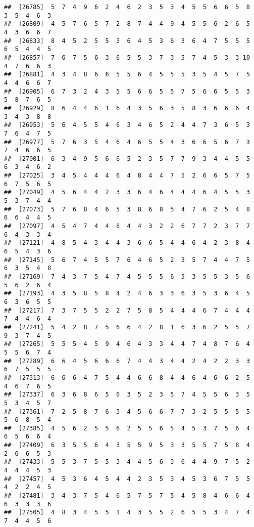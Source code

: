 \documentclass[
]{book}
\begin{document}
\begin{verbatim}
##  [26785]  5  7  4  9  6  2  4  6  2  3  5  3  4  5  5  6  6  5  8  3  5  4  6  3
##  [26809]  4  5  7  6  5  7  2  8  7  4  4  9  4  5  5  6  2  6  5  4  3  6  6  7
##  [26833]  8  4  5  2  5  5  3  6  4  5  3  6  3  6  4  7  5  5  5  6  5  4  4  5
##  [26857]  7  6  7  5  6  3  6  5  5  3  7  3  5  7  4  5  3  3 10  4  7  6  6  3
##  [26881]  4  3  4  8  6  6  5  5  6  4  5  5  5  3  5  4  5  7  5  4  4  6  6  7
##  [26905]  6  7  3  2  4  3  5  5  6  6  5  5  7  5  6  6  5  5  3  5  8  7  6  5
##  [26929]  8  6  4  4  6  1  6  4  3  5  6  3  5  8  3  6  6  6  4  3  4  3  8  8
##  [26953]  5  6  4  5  5  4  6  3  4  6  5  2  4  4  7  3  6  5  3  7  6  4  7  5
##  [26977]  5  7  6  3  5  4  6  4  6  5  5  4  3  6  6  5  6  7  3  7  4  6  6  5
##  [27001]  6  3  4  9  5  6  6  5  2  3  5  7  7  9  3  4  4  5  5  6  3  4  6  2
##  [27025]  3  4  5  4  4  4  6  4  8  4  4  7  5  2  6  6  5  7  5  6  7  5  6  5
##  [27049]  4  5  6  4  4  2  3  3  6  4  6  4  4  4  6  4  5  5  3  5  3  7  4  4
##  [27073]  5  7  6  8  4  6  5  3  8  6  8  5  4  7  6  2  5  4  8  6  6  4  4  5
##  [27097]  4  5  4  7  4  4  8  4  4  3  2  2  6  7  7  2  3  7  7  6  4  3  3  4
##  [27121]  4  8  5  4  3  4  4  3  6  6  5  4  4  6  4  2  3  8  4  6  5  4  3  6
##  [27145]  5  6  7  4  5  5  7  6  4  6  5  2  3  5  7  4  4  7  5  6  3  5  4  8
##  [27169]  7  4  3  7  5  4  7  4  5  5  5  6  5  3  5  5  3  5  6  5  6  2  6  4
##  [27193]  4  3  5  8  5  8  4  2  4  6  3  3  6  3  5  3  6  4  5  6  3  6  5  5
##  [27217]  7  3  7  5  5  2  2  7  5  8  5  4  4  4  6  7  4  4  4  7  4  4  6  4
##  [27241]  5  4  2  8  7  5  6  6  4  2  8  1  6  3  6  2  5  5  7  9  3  7  4  5
##  [27265]  5  5  5  4  5  9  4  6  4  3  3  4  4  7  4  8  7  6  4  5  5  6  7  4
##  [27289]  6  6  4  5  6  6  6  7  4  4  3  4  4  2  4  2  2  3  3  6  7  5  5  5
##  [27313]  6  6  6  4  7  5  4  4  6  6  8  4  4  6  4  6  6  2  5  4  6  7  6  5
##  [27337]  6  3  6  8  6  5  6  3  5  2  3  5  7  4  5  5  6  3  5  5  3  4  5  7
##  [27361]  7  2  5  8  7  6  3  4  5  6  6  7  7  3  2  5  5  5  5  5  6  8  5  4
##  [27385]  4  5  6  2  5  5  6  2  5  5  6  5  4  5  3  7  5  6  4  6  5  6  6  4
##  [27409]  6  3  5  5  6  4  3  5  5  9  5  3  3  5  5  7  5  8  4  2  6  6  5  3
##  [27433]  5  5  3  7  5  5  3  4  4  5  6  3  6  4  4  9  7  5  2  4  4  4  5  3
##  [27457]  4  5  3  6  4  5  4  4  2  3  5  3  4  5  3  6  7  5  5  4  2  2  4  5
##  [27481]  3  4  3  7  5  4  6  5  7  5  7  5  4  5  8  4  6  6  4  6  3  3  3  6
##  [27505]  4  8  3  4  5  5  1  4  3  5  5  2  6  5  5  3  4  7  4  7  4  4  5  6

\end{verbatim}
\end{document}
